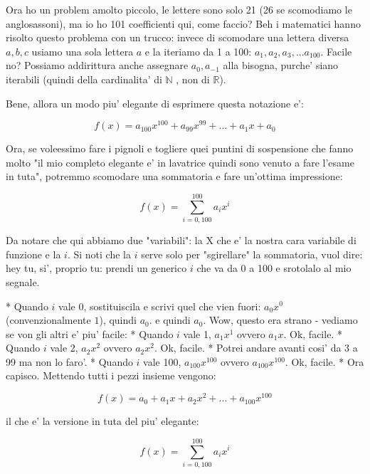 Ora ho un problem amolto piccolo, le lettere sono solo 21 (26 se scomodiamo le anglosassoni), ma io ho 101 coefficienti qui,
come faccio? Beh i matematici hanno risolto questo problema con un trucco: invece di scomodare una lettera diversa $a,b,c$ 
usiamo una sola lettera $a$ e la iteriamo da 1 a 100: $ a_1, a_2, a_3, ... a_100 $. Facile no? Possiamo addirittura anche
assegnare $ a_0, a_{-1} $ alla bisogna, purche' siano iterabili (quindi della cardinalita' di $\mathbb{N}$ , non di $\mathbb{R}$). 

Bene, allora un modo piu' elegante di esprimere questa notazione e': 

\begin{equation}
  f(x)= a_{100} x^{100} + a_99 x^99 + ... + a_1 x + a_0
\end{equation}

Ora, se voleessimo fare i pignoli e togliere quei puntini di sospensione che fanno molto "il mio completo elegante e'
in lavatrice quindi sono venuto a fare l'esame in tuta", potremmo scomodare una sommatoria e fare un'ottima impressione: 

\begin{equation}
  f(x)= \sum_{i=0,100}^100 a_i x^i 
\end{equation}

Da notare che qui abbiamo due "variabili": la X che e' la  nostra cara variabile di funzione e la $i$. Si noti che la $i$
serve solo per "sgirellare" la sommatoria, vuol dire: hey tu, si', proprio tu: prendi un generico $i$ che va da 0 a 100 e 
srotolalo al mio segnale. 

* Quando $i$ vale 0, sostituiscila e scrivi quel che vien fuori: $a_0 x^0$ (convenzionalmente $1$), quindi  $a_0$.
  e quindi $a_0$. Wow, questo era strano - vediamo se von gli altri e' piu' facile: 
* Quando $i$ vale 1, $a_1 x^1$ ovvero $a_1 x$. Ok, facile.
* Quando $i$ vale 2, $a_2 x^2$ ovvero $a_2 x^2$. Ok, facile.
* Potrei andare avanti cosi' da 3 a 99 ma non lo faro'.
* Quando $i$ vale 100, $a_100 x^100$ ovvero $a_100 x^100$. Ok, facile. 
* Ora capisco. Mettendo tutti i pezzi insieme vengono: 

\begin{equation}
  f(x)= a_0 + a_1 x + a_2 x^2 + ... + a_100 x^100
\end{equation}

il che e' la versione in tuta del piu' elegante: 

\begin{equation}
  f(x)= \sum_{i=0,100}^100 a_i x^i 
\end{equation}

